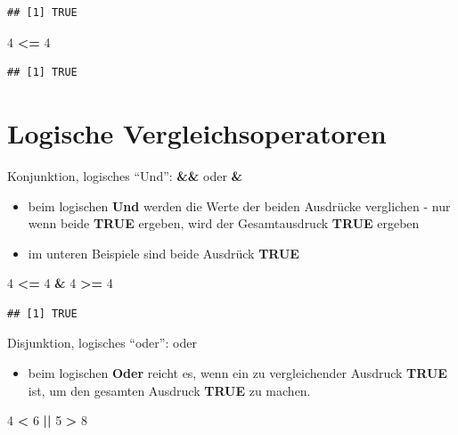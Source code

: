 \documentclass[]{book}
\newenvironment{Shaded}{\begin{snugshade}}{\end{snugshade}}
\newcommand{\DecValTok}[1]{\textcolor[rgb]{0.00,0.00,0.81}{#1}}
\newcommand{\StringTok}[1]{\textcolor[rgb]{0.31,0.60,0.02}{#1}}
\newcommand{\OperatorTok}[1]{\textcolor[rgb]{0.81,0.36,0.00}{\textbf{#1}}}
\providecommand{\tightlist}{%
  \setlength{\itemsep}{0pt}\setlength{\parskip}{0pt}}
\begin{document}
\begin{verbatim}
## [1] TRUE
\end{verbatim}

\begin{Shaded}
\begin{Highlighting}[]
\DecValTok{4} \OperatorTok{<=}\StringTok{ }\DecValTok{4}
\end{Highlighting}
\end{Shaded}

\begin{verbatim}
## [1] TRUE
\end{verbatim}

\section{Logische
Vergleichsoperatoren}\label{logische-vergleichsoperatoren}

Konjunktion, logisches ``Und'': \textbf{\&\&} oder \textbf{\&}

\begin{itemize}
\tightlist
\item
  beim logischen \textbf{Und} werden die Werte der beiden Ausdrücke
  verglichen - nur wenn beide \textbf{TRUE} ergeben, wird der
  Gesamtausdruck \textbf{TRUE} ergeben
\item
  im unteren Beispiele sind beide Ausdrück \textbf{TRUE}
\end{itemize}

\begin{Shaded}
\begin{Highlighting}[]
\DecValTok{4} \OperatorTok{<=}\StringTok{ }\DecValTok{4} \OperatorTok{&}\StringTok{ }\DecValTok{4} \OperatorTok{>=}\StringTok{ }\DecValTok{4}
\end{Highlighting}
\end{Shaded}

\begin{verbatim}
## [1] TRUE
\end{verbatim}

Disjunktion, logisches ``oder'': \textbf{\textbar{}\textbar{}} oder
\textbf{\textbar{}}

\begin{itemize}
\tightlist
\item
  beim logischen \textbf{Oder} reicht es, wenn ein zu vergleichender
  Ausdruck \textbf{TRUE} ist, um den gesamten Ausdruck \textbf{TRUE} zu
  machen.
\end{itemize}

\begin{Shaded}
\begin{Highlighting}[]
\DecValTok{4} \OperatorTok{<}\StringTok{ }\DecValTok{6} \OperatorTok{||}\StringTok{ }\DecValTok{5} \OperatorTok{>}\StringTok{ }\DecValTok{8}
\end{Highlighting}
\end{Shaded}
\end{document}
